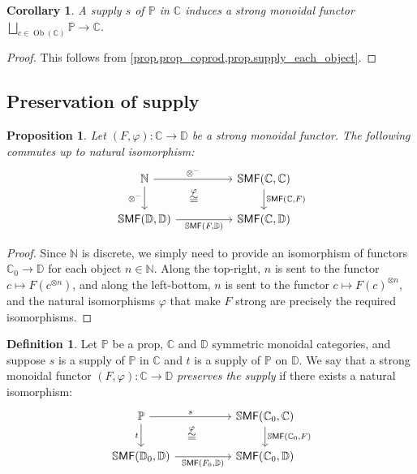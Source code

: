\documentclass[11pt, oneside, article]{memoir}
\theoremstyle{plain}
\newtheorem{proposition}[theorem]{Proposition}
\newtheorem{corollary}[theorem]{Corollary}
\theoremstyle{definition}
\newtheorem{definition}[theorem]{Definition}
\theoremstyle{remark}
\newcommand{\Set}[1]{\mathrm{#1}}%
\newcommand{\Cat}[1]{{\mathsf{#1}}}%
\newcommand{\CCat}[1]{\mathbb{\StrLeft{#1}{1}}\Cat{\StrGobbleLeft{#1}{1}}}%
\DeclareMathOperator{\ob}{\Set{Ob}}
\newcommand{\tpow}[1]{^{\otimes #1}}
\newcommand{\ssmf}{\CCat{SMF}}
\newcommand{\cc}{\mathbb{C}}
\newcommand{\dd}{\mathbb{D}}
\newcommand{\nn}{\mathbb{N}}
\newcommand{\pp}{\mathbb{P}}
\newcommand{\mob}[1]{#1_0}
\newcommand{\too}{\longrightarrow}
\begin{document}
\begin{corollary} \label{cor.supply_each_object}
A supply $s$ of $\pp$ in $\cc$ induces a strong monoidal functor $\bigsqcup_{c\in\ob(\cc)}\pp\too\cc$.
\end{corollary}
\begin{proof}
This follows from \cref{prop.prop_coprod,prop.supply_each_object}.
\end{proof}

\subsection{Preservation of supply}

\begin{proposition}\label{prop.nat_strong_isos}
Let $(F,\varphi)\colon\cc\to\dd$ be a strong monoidal functor. The following commutes up to natural isomorphism:
\[
\begin{tikzcd}[column sep=50pt]
	\nn\ar[r, "\otimes^-"]\ar[d, "\otimes^-"']&
	\ssmf(\cc,\cc)\ar[d, "{\ssmf(\cc,F)}"]\\
	\ssmf(\dd,\dd)\ar[r, "{\ssmf(F,\dd)}"']&
	\ssmf(\cc,\dd)\ar[ul, phantom, "\overset{\varphi}{\cong}"]
\end{tikzcd}
\]
\end{proposition}
\begin{proof}
Since $\nn$ is discrete, we simply need to provide an isomorphism of functors $\cc_0\to\dd$ for each object $n\in\nn$. Along the top-right, $n$ is sent to the functor $c\mapsto F(c\tpow{n})$, and along the left-bottom, $n$ is sent to the functor $c\mapsto F(c)\tpow{n}$, and the natural isomorphisms $\varphi$ that make $F$ strong are precisely the required isomorphisms.
\end{proof}

\begin{definition}\label{def.preserve_supply}
Let $\pp$ be a prop, $\cc$ and $\dd$ symmetric monoidal categories, and suppose $s$ is a supply of $\pp$ in $\cc$ and $t$ is a supply of $\pp$ on $\dd$. We say that a strong monoidal functor $(F,\varphi)\colon\cc\to\dd$ \emph{preserves the supply} if there exists a natural isomorphism:
\begin{equation}\label{eqn.pres_supply}
\begin{tikzcd}[column sep=50pt]
	\pp\ar[r, "s"]\ar[d, "t"']&
	\ssmf(\mob{\cc},\cc)\ar[d, "{\ssmf(\mob{\cc},F)}"]\\
	\ssmf(\mob{\dd},\dd)\ar[r, "{\ssmf(\mob{F},\dd)}"']&
	\ssmf(\mob{\cc},\dd)\ar[ul, phantom, "\overset{\varphi}{\cong}"]
\end{tikzcd}
\end{equation}
\end{definition}
\end{document}
